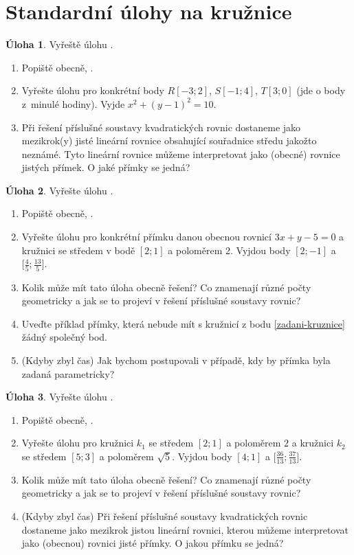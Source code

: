 \documentclass[10pt,a5paper]{extarticle}
\def\tisk{%
\newbox\shipouthackbox
\pdfpagewidth=2\pdfpagewidth
\let\oldshipout=\shipout
\def\shipout{\afterassignment\zdvojtmp \setbox\shipouthackbox=}%
\def\zdvojtmp{\aftergroup\zdvoj}%
\def\zdvoj{%
    \oldshipout\vbox{\hbox{%
        \copy\shipouthackbox
        \hskip\dimexpr .5\pdfpagewidth-\wd\shipouthackbox\relax
        \box\shipouthackbox
    }}%
}}%
\theoremstyle{definition}
\newtheorem{uloha}{\atr Úloha}
\let\ee\expandafter
\def\locvysl#1{\ee\gdef\ee\locvysld\ee{\locvysld\item #1}}
\let\lv\locvysl
\def\atr{}
\begin{document}

\section*{Standardní úlohy na kružnice}


\begin{uloha}
Vyřeště úlohu .
\begin{enumerate}
    \item Popiště obecně, .
    \item Vyřešte úlohu pro konkrétní body $R[-3;2]$, $S[-1;4]$, $T[3;0]$ (jde o body z~minulé hodiny). Vyjde $x^2+(y-1)^2=10$.%
    \item Při řešení příslušné soustavy kvadratických rovnic dostaneme jako mezikrok(y) jisté lineární rovnice obsahující souřadnice středu jakožto neznámé. Tyto lineární rovnice můžeme interpretovat jako (obecné) rovnice jistých přímek. O jaké přímky se jedná?
\end{enumerate}
\end{uloha}

\begin{uloha}
Vyřešte úlohu .
\begin{enumerate}
    \item Popiště obecně, .
    \item Vyřešte úlohu pro konkrétní přímku danou obecnou rovnicí $3x + y - 5 = 0$ a kružnici se středem v bodě $[2;1]$ a poloměrem 2. Vyjdou body $[2;-1]$ a $\bigl[\frac45; \frac{13}{5}\bigr]$.\label{zadani-kruznice}
    \item Kolik může mít tato úloha obecně řešení? Co znamenají různé počty geometricky a jak se to projeví v řešení příslušné soustavy rovnic?
    \item Uveďte příklad přímky, která nebude mít s kružnicí z bodu \ref{zadani-kruznice} žádný společný bod.
    \item (Kdyby zbyl čas) Jak bychom postupovali v případě, kdy by přímka byla zadaná parametricky?
\end{enumerate}
\end{uloha}


\begin{uloha}
Vyřešte úlohu .
\begin{enumerate}
    \item Popiště obecně, .
    \item Vyřešte úlohu pro kružnici $k_1$ se středem $[2;1]$ a poloměrem $2$ a kružnici $k_2$ se středem $[5;3]$ a poloměrem $\sqrt5$. Vyjdou body $[4;1]$ a $\bigl[\frac{36}{13};\frac{37}{13}\bigr]$.
    \item Kolik může mít tato úloha obecně řešení? Co znamenají různé počty geometricky a jak se to projeví v řešení příslušné soustavy rovnic?
    \item (Kdyby zbyl čas) Při řešení příslušné soustavy kvadratických rovnic dostaneme jako mezikrok jistou lineární rovnici, kterou můžeme interpretovat jako (obecnou) rovnici jisté přímky. O jakou přímku se jedná?
\end{enumerate}
\end{uloha}
\end{document}
